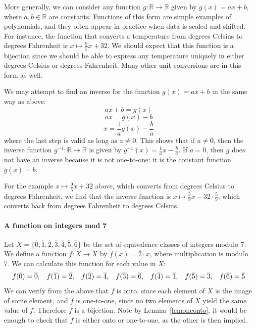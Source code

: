 More generally, we can consider any function $g \colon \mathbb{R} \to \mathbb{R}$ given by $g(x) = ax+b$, where $a,b \in \mathbb{R}$ are constants.  
Functions of this form are simple examples of polynomials, and they often appear in practice when data is scaled and shifted.
For instance, the function that converts a temperature from degrees Celsius to degrees Fahrenheit is $x \mapsto \frac{9}{5} x + 32$.
We should expect that this function is a bijection since we should be able to express any temperature uniquely in either degrees Celsius or degrees Fahrenheit.
Many other unit conversions are in this form as well.

We may attempt to find an inverse for the function $g(x) = ax+b$ in the same way as above:
\[
ax+b = g(x)
\]
\[
ax=g(x)-b
\]
\[
x = \frac{1}{a}g(x)-\frac{b}{a}
\]
where the last step is valid as long as $a \neq 0$.
This shows that if $a \neq 0$, then the inverse function $g^{-1} \colon \mathbb{R} \to \mathbb{R}$ is given by $g^{-1}(x) = \frac{1}{a}x-\frac{b}{a}$.
If $a=0$, then $g$ does not have an inverse because it is not one-to-one: it is the constant function $g(x)=b$.

For the example $x \mapsto \frac{9}{5} x + 32$ above, which converts from degrees Celsius to degrees Fahrenheit, we find that the inverse function is $x \mapsto \frac{5}{9} x - 32 \cdot \frac{5}{9}$, which converts back from degrees Fahrenheit to degrees Celsius.

\paragraph{A function on integers mod 7}

Let $X = \{ \overline{0}, \overline{1}, \overline{2}, \overline{3}, \overline{4}, \overline{5}, \overline{6}\}$ be the set of equivalence classes of integers modulo 7.
We define a function $f \colon X \to X$ by $f(x) = \overline{2} \cdot x$, where multiplication is modulo 7.
We can calculate this function for each value in $X$:
\[
f(\overline{0}) = \overline{0}, \hspace{.3cm}
f(\overline{1}) = \overline{2}, \hspace{.3cm}
f(\overline{2}) = \overline{4}, \hspace{.3cm}
f(\overline{3}) = \overline{6}, \hspace{.3cm}
f(\overline{4}) = \overline{1}, \hspace{.3cm}
f(\overline{5}) = \overline{3}, \hspace{.3cm}
f(\overline{6}) = \overline{5}
\]
We can verify from the above that $f$ is onto, since each element of $X$ is the image of some element, and $f$ is one-to-one, since no two elements of $X$ yield the same value of $f$.
Therefore $f$ is a bijection.
Note by Lemma~\ref{lemoneonto},
it would be enough to check that $f$ is either onto or one-to-one, as the other is then implied.

